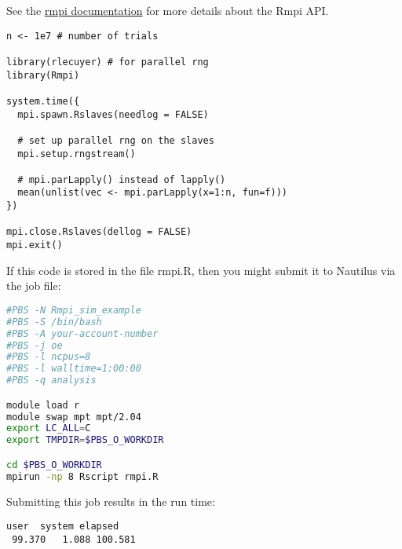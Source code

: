 %
See the \href{http://cran.r-project.org/web/packages/Rmpi/Rmpi.pdf}{rmpi documentation} for more details about the Rmpi API.
\begin{lstlisting}[language=rr]
n <- 1e7 # number of trials

library(rlecuyer) # for parallel rng
library(Rmpi)

system.time({
  mpi.spawn.Rslaves(needlog = FALSE)

  # set up parallel rng on the slaves
  mpi.setup.rngstream() 

  # mpi.parLapply() instead of lapply()
  mean(unlist(vec <- mpi.parLapply(x=1:n, fun=f)))
})

mpi.close.Rslaves(dellog = FALSE)
mpi.exit()
\end{lstlisting}

If this code is stored in the file rmpi.R, then you might submit it to Nautilus via the job file:

\begin{lstlisting}[language=sh]
#PBS -N Rmpi_sim_example
#PBS -S /bin/bash
#PBS -A your-account-number
#PBS -j oe
#PBS -l ncpus=8
#PBS -l walltime=1:00:00
#PBS -q analysis

module load r
module swap mpt mpt/2.04
export LC_ALL=C
export TMPDIR=$PBS_O_WORKDIR

cd $PBS_O_WORKDIR
mpirun -np 8 Rscript rmpi.R
\end{lstlisting}%
Submitting this job results in the run time:
\begin{lstlisting}[language=rr]
   user  system elapsed 
 99.370   1.088 100.581 
\end{lstlisting}


